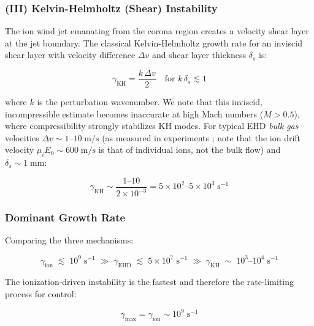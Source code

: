 \documentclass[12pt,twocolumn]{article}
\begin{document}
\subsubsection{(III) Kelvin-Helmholtz (Shear) Instability}

The ion wind jet emanating from the corona region creates a velocity
shear layer at the jet boundary. The classical Kelvin-Helmholtz
growth rate for an inviscid shear layer with velocity difference
$\Delta v$ and shear layer thickness $\delta_s$ is:

\begin{equation}
  \gamma_{\mathrm{KH}}
  = \frac{k\,\Delta v}{2}
  \quad \text{for } k\,\delta_s \lesssim 1
  \label{eq:gamma_KH}
\end{equation}

where $k$ is the perturbation wavenumber. We note that this inviscid,
incompressible estimate becomes inaccurate at high Mach numbers
($M > 0.5$), where compressibility strongly stabilizes KH modes.
For typical EHD \emph{bulk gas} velocities $\Delta v \sim
1$--$10\;\mathrm{m/s}$ (as measured in experiments \cite{Xu2018,
Moreau2007}; note that the ion drift velocity $\mu_i E_0 \sim
600\;\mathrm{m/s}$ is that of individual ions, not the bulk flow)
and $\delta_s \sim 1\;\mathrm{mm}$:

\begin{equation}
  \gamma_{\mathrm{KH}}
  \sim \frac{1\text{--}10}{2 \times 10^{-3}}
  = 5 \times 10^2\text{--}5 \times 10^3\;\mathrm{s^{-1}}
  \label{eq:gamma_KH_num}
\end{equation}

\subsubsection{Dominant Growth Rate}

Comparing the three mechanisms:

\begin{equation}
  \gamma_{\mathrm{ion}} \;\lesssim\; 10^{9}\;\mathrm{s^{-1}}
  \;\gg\; \gamma_{\mathrm{EHD}} \;\lesssim\; 5 \times 10^{7}\;\mathrm{s^{-1}}
  \;\gg\; \gamma_{\mathrm{KH}} \;\sim\; 10^{3}\text{--}10^{4}\;\mathrm{s^{-1}}
  \label{eq:gamma_hierarchy}
\end{equation}

The ionization-driven instability is the fastest and therefore the
rate-limiting process for control:

\begin{equation}
\boxed{
  \gamma_{\max}
  = \gamma_{\mathrm{ion}}
  \sim 10^{9}\;\mathrm{s^{-1}}
}
\label{eq:gamma_max}
\end{equation}
\end{document}
